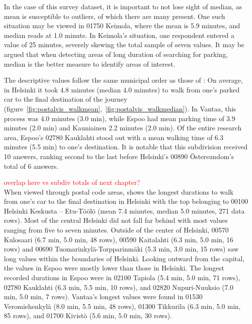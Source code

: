 In the case of this survey dataset, it is important to not lose sight of median, as mean is susceptible to outliers, of which there are many present. One such situation may be viewed in 01750 Keimola, where the mean  is 5.9 minutes, and median reads at 1.0 minute. In Keimola's situation, one respondent entered a  value of 25 minutes, severely skewing the total sample of seven values. It may be argued that when detecting areas of long duration of searching for parking, median is the better measure to identify areas of interest.

The descriptive  values follow the same municipal order as those of : On average, in Helsinki it took 4.8 minutes (median 4.0 minutes) to walk from one's parked car to the final destination of the journey (figure~\ref{fig:postalvis_walkmean},~\ref{fig:postalvis_walkmedian}). In Vantaa, this process was 4.0 minutes (3.0 min), while Espoo had mean parking time of 3.9 minutes (2.0 min) and Kauniainen 2.2 minutes (2.0 min). Of the entire research area, Espoo's 02780 Kauklahti stood out with a mean walking time of 6.3 minutes (5.5 min) to one's destination. It is notable that this subdivision received 10 answers, ranking second to the last before Helsinki's 00890 Östersundom's total of 6 answers.

\textcolor{red}{overlap here vs subdiv totals of next chapter?}\\
When viewed through postal code areas,  shows the longest durations to walk from one's car to the final destination in Helsinki with the top belonging to 00100 Helsinki Keskusta -- Etu-Töölö (mean 7.4 minutes, median 5.0 minutes, 271 data rows). Most of the central Helsinki did not fall far behind with most values ranging from five to seven minutes. Outside of the center of Helsinki, 00570 Kulosaari (6.7 min, 5.0 min, 48 rows), 00590 Kaitalahti (6.3 min, 5.0 min, 16 rows) and 00690 Tuomarinkylä-Torpparinmäki (5.3 min, 3.0 min, 15 rows) saw long  values within the boundaries of Helsinki. Looking outward from the capital, the  values in Espoo were mostly lower than those in Helsinki. The longest recorded durations in Espoo were in 02100 Tapiola (5.4 min, 5.0 min, 71 rows), 02780 Kauklahti (6.3 min, 5.5 min, 10 rows), and 02820 Nupuri-Nuuksio (7.0 min, 5.0 min, 7 rows). Vantaa's longest  values were found in 01530 Veromiehenkylä (8.0 min, 5.5 min, 48 rows), 01300 Tikkurila (6.3 min, 5.0 min, 85 rows), and 01700 Kivistö (5.6 min, 5.0 min, 30 rows). 

